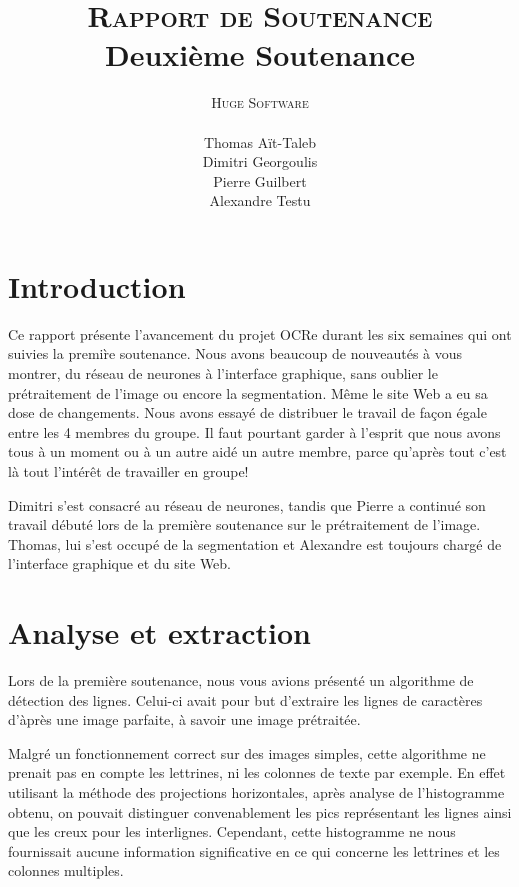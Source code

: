 \documentclass[a4paper,10pt]{report}
\title{\textsc{Rapport de Soutenance} \\ Deuxi\`eme Soutenance}
\author{\textsc{Huge Software}\\ \\ Thomas A\"it-Taleb \\ Dimitri Georgoulis \\ Pierre Guilbert \\ Alexandre Testu}
\date{}
\begin{document}
\lstset{language=C}
\dominitoc
\maketitle
\tableofcontents \pagebreak
\thispagestyle{fancy}

\chapter{Introduction} %
\label{cha:introduction}

Ce rapport pr\'esente l'avancement du projet OCRe durant les six semaines qui ont suivies la premi\`re soutenance. Nous avons beaucoup de nouveaut\'es \`a vous montrer, du r\'eseau de neurones \`a l'interface graphique, sans oublier le pr\'etraitement de l'image ou encore la segmentation. M\^eme le site Web a eu sa dose de changements. Nous avons essay\'e de distribuer le travail de fa\c con \'egale entre les 4 membres du groupe. Il faut pourtant garder \`a l'esprit que nous avons tous \`a un moment ou \`a un autre aid\'e un autre membre, parce qu'apr\`es tout c'est l\`a tout l'int\'er\^et de travailler en groupe!

Dimitri s'est consacr\'e au r\'eseau de neurones, tandis que Pierre a continu\'e son travail d\'ebut\'e lors de la premi\`ere soutenance sur le pr\'etraitement de l'image. Thomas, lui s'est occup\'e de la segmentation et Alexandre est toujours charg\'e de l'interface graphique et du site Web.



\chapter{Analyse et extraction}
\label{cha:analyse_et_extraction}
Lors de la première soutenance, nous vous avions présenté un algorithme
de détection des lignes. Celui-ci avait pour but d'extraire les lignes
de caractères d'àprès une image parfaite, à savoir une image prétraitée.

Malgré un fonctionnement correct sur des images simples, cette
algorithme ne prenait pas en compte les lettrines, ni les colonnes de
texte par exemple. En effet utilisant la méthode des projections
horizontales, après analyse de l'histogramme obtenu, on pouvait
distinguer convenablement les pics représentant les lignes ainsi que les
creux pour les interlignes. Cependant, cette histogramme ne nous
fournissait aucune information significative en ce qui concerne les
lettrines et les colonnes multiples.
\end{document}
